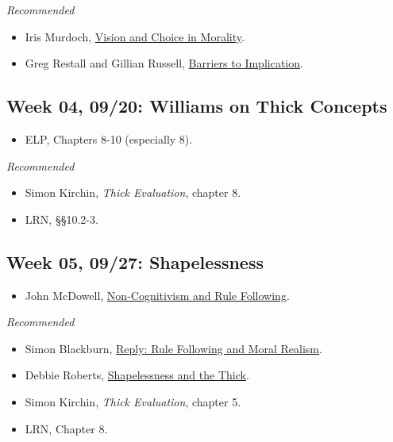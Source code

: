 \documentclass[
]{article}
\providecommand{\tightlist}{%
  \setlength{\itemsep}{0pt}\setlength{\parskip}{0pt}}
\begin{document}
\emph{Recommended}

\begin{itemize}
\tightlist
\item
  Iris Murdoch,
  \href{https://www.jstor.org/stable/4106662?seq=19\#metadata_info_tab_contents}{Vision
  and Choice in Morality}.
\item
  Greg Restall and Gillian Russell,
  \href{https://consequently.org/papers/barriers.pdf}{Barriers to
  Implication}.
\end{itemize}

\hypertarget{week-04-0920-williams-on-thick-concepts}{%
\subsection{Week 04, 09/20: Williams on Thick
Concepts}\label{week-04-0920-williams-on-thick-concepts}}

\begin{itemize}
\tightlist
\item
  ELP, Chapters 8-10 (especially 8).
\end{itemize}

\emph{Recommended}

\begin{itemize}
\tightlist
\item
  Simon Kirchin, \emph{Thick Evaluation}, chapter 8.
\item
  LRN, §§10.2-3.
\end{itemize}

\hypertarget{week-05-0927-shapelessness}{%
\subsection{Week 05, 09/27:
Shapelessness}\label{week-05-0927-shapelessness}}

\begin{itemize}
\tightlist
\item
  John McDowell,
  \href{http://brian.weatherson.org/640-F21/McDowell.pdf}{Non-Cognitivism
  and Rule Following}.
\end{itemize}

\emph{Recommended}

\begin{itemize}
\tightlist
\item
  Simon Blackburn,
  \href{http://brian.weatherson.org/640-F21/Blackburn.pdf}{Reply: Rule
  Following and Moral Realism}.
\item
  Debbie Roberts,
  \href{https://www.jstor.org/stable/10.1086/658898}{Shapelessness and
  the Thick}.
\item
  Simon Kirchin, \emph{Thick Evaluation}, chapter 5.
\item
  LRN, Chapter 8.
\end{itemize}
\end{document}

